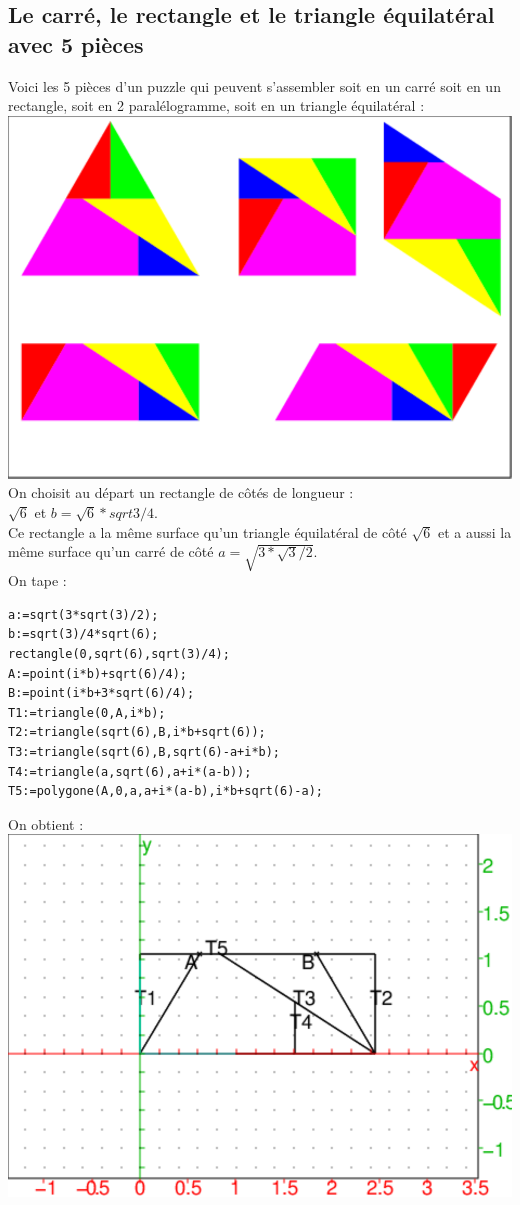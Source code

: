 \documentclass[a4paper,11pt]{book}
\begin{document}
\subsection{Le carr\'e, le rectangle et le triangle \'equilat\'eral avec 5 
pi\`eces}
Voici les 5 pi\`eces d'un puzzle qui peuvent s'assembler soit en un carr\'e 
soit en un rectangle, soit en 2 paral\'elogramme,  soit en un triangle 
\'equilat\'eral :\\
\includegraphics[width=\textwidth]{puzzlecatri5}\\
On choisit au d\'epart un rectangle de c\^ot\'es de longueur :\\
$\sqrt 6$ et $b=\sqrt 6*sqrt 3/4$.\\
Ce rectangle a la m\^eme surface qu'un triangle \'equilat\'eral de c\^ot\'e 
$\sqrt 6$ et a aussi la m\^eme surface qu'un carr\'e de c\^ot\'e 
$a=\sqrt{3*\sqrt 3/2}$.\\
On tape :
\begin{verbatim}
a:=sqrt(3*sqrt(3)/2);
b:=sqrt(3)/4*sqrt(6);
rectangle(0,sqrt(6),sqrt(3)/4);
A:=point(i*b)+sqrt(6)/4);
B:=point(i*b+3*sqrt(6)/4);
T1:=triangle(0,A,i*b);
T2:=triangle(sqrt(6),B,i*b+sqrt(6));
T3:=triangle(sqrt(6),B,sqrt(6)-a+i*b);
T4:=triangle(a,sqrt(6),a+i*(a-b));
T5:=polygone(A,0,a,a+i*(a-b),i*b+sqrt(6)-a);
\end{verbatim}
On obtient :\\
\includegraphics[width=\textwidth]{puzzlecatri0}\\
\end{document}
